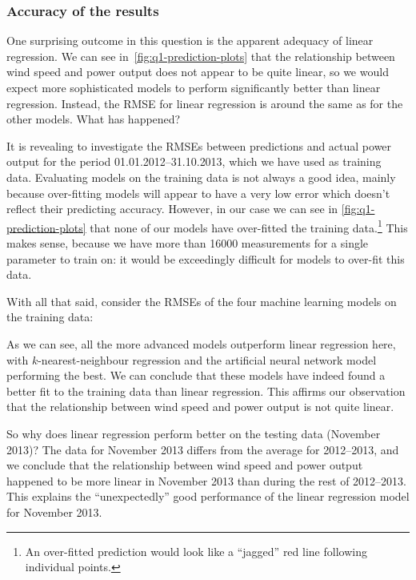 \documentclass[11pt]{article}
\begin{document}
\subsubsection*{Accuracy of the results}

One surprising outcome in this question is the apparent adequacy of linear regression.
We can see in~\cref{fig:q1-prediction-plots} that the relationship between wind speed and power output does not appear to be quite linear, so we would expect more sophisticated models to perform significantly better than linear regression.
Instead, the RMSE for linear regression is around the same as for the other models.
What has happened?

It is revealing to investigate the RMSEs between predictions and actual power output for the period 01.01.2012--31.10.2013, which we have used as training data.
Evaluating models on the training data is not always a good idea, mainly because over-fitting models will appear to have a very low error which doesn't reflect their predicting accuracy.
However, in our case we can see in \cref{fig:q1-prediction-plots} that none of our models have over-fitted the training data.\footnote{An over-fitted prediction would look like a ``jagged'' red line following individual points.}
This makes sense, because we have more than 16000 measurements for a single parameter to train on: it would be exceedingly difficult for models to over-fit this data.

With all that said, consider the RMSEs of the four machine learning models on the training data:
\begin{center}
\end{center}

As we can see, all the more advanced models outperform linear regression here, with $k$-nearest-neighbour regression and the artificial neural network model performing the best.
We can conclude that these models have indeed found a better fit to the training data than linear regression.
This affirms our observation that the relationship between wind speed and power output is not quite linear.

So why does linear regression perform better on the testing data (November 2013)?
The data for November 2013 differs from the average for 2012--2013, and we conclude that the relationship between wind speed and power output happened to be more linear in November 2013 than during the rest of 2012--2013.
This explains the ``unexpectedly'' good performance of the linear regression model for November 2013.
\end{document}
